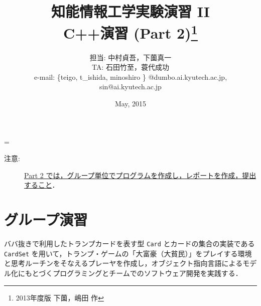 %
%
\title{{\normalsize 知能情報工学実験演習 II }\\
\bf C++演習 (Part 2)\footnote{2013年度版 下薗，嶋田 作} }
\author{担当: 中村貞吾，下薗真一\\
TA: 石田竹至，蓑代成功\\
\small
e-mail: 
{\sf \{teigo,  t\_ishida, minoshiro \} @dumbo.ai.kyutech.ac.jp},\\
\small
{\sf sin@ai.kyutech.ac.jp}
}
\date{May, 2015}
%
%
\def\linesparpage#1{\baselineskip=\textheight\divide\baselineskip#1}
\newtheorem{exerc}{演習}
\newtheorem{adv}{発展課題}

\setlength{\textwidth}{165mm}       %
\setlength{\textheight}{255mm}      %
\setlength{\oddsidemargin}{-2mm}     %
\setlength{\evensidemargin}{0mm}    %
\setlength{\topmargin}{-20mm}         %

%
%

\linesparpage{36}
\maketitle

\medskip

\begin{description}
\item[注意:] \underline{Part 2 では，グループ単位でプログラムを作成し，レポートを作成，提出すること}．
\end{description}

\medskip

\section{グループ演習}
ババ抜きで利用したトランプカードを表す型 \verb+Card+ とカードの集合の実装である \verb+CardSet+ を用いて，トランプ・ゲームの「大富豪（大貧民）」をプレイする環境と思考ルーチンをそなえるプレーヤを作成し，オブジェクト指向言語によるモデル化にもとづくプログラミングとチームでのソフトウェア開発を実践する．

